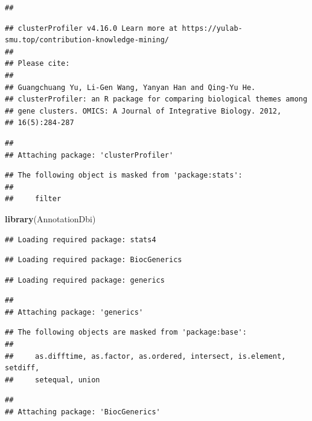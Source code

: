\documentclass[
]{article}
\newenvironment{Shaded}{\begin{snugshade}}{\end{snugshade}}
\newcommand{\FunctionTok}[1]{\textcolor[rgb]{0.13,0.29,0.53}{\textbf{#1}}}
\newcommand{\NormalTok}[1]{#1}
\begin{document}
\begin{verbatim}
## 
\end{verbatim}

\begin{verbatim}
## clusterProfiler v4.16.0 Learn more at https://yulab-smu.top/contribution-knowledge-mining/
## 
## Please cite:
## 
## Guangchuang Yu, Li-Gen Wang, Yanyan Han and Qing-Yu He.
## clusterProfiler: an R package for comparing biological themes among
## gene clusters. OMICS: A Journal of Integrative Biology. 2012,
## 16(5):284-287
\end{verbatim}

\begin{verbatim}
## 
## Attaching package: 'clusterProfiler'
\end{verbatim}

\begin{verbatim}
## The following object is masked from 'package:stats':
## 
##     filter
\end{verbatim}

\begin{Shaded}
\begin{Highlighting}[]
\FunctionTok{library}\NormalTok{(AnnotationDbi)}
\end{Highlighting}
\end{Shaded}

\begin{verbatim}
## Loading required package: stats4
\end{verbatim}

\begin{verbatim}
## Loading required package: BiocGenerics
\end{verbatim}

\begin{verbatim}
## Loading required package: generics
\end{verbatim}

\begin{verbatim}
## 
## Attaching package: 'generics'
\end{verbatim}

\begin{verbatim}
## The following objects are masked from 'package:base':
## 
##     as.difftime, as.factor, as.ordered, intersect, is.element, setdiff,
##     setequal, union
\end{verbatim}

\begin{verbatim}
## 
## Attaching package: 'BiocGenerics'
\end{verbatim}
\end{document}
